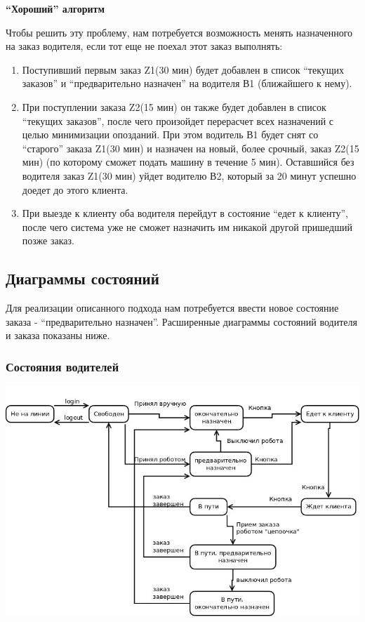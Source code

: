 		\textbf{“Хороший” алгоритм}

		Чтобы решить эту проблему, нам потребуется возможность менять назначенного на заказ водителя, если тот еще не поехал этот заказ выполнять:
		\begin{enumerate}

			\item{Поступивший первым заказ Z1(30 мин) будет добавлен в список “текущих заказов” и “предварительно назначен” на водителя В1 (ближайшего к нему).}

			\item{При поступлении заказа Z2(15 мин) он также будет добавлен в список “текущих заказов”, после чего произойдет перерасчет всех назначений с целью минимизации опозданий. При этом водитель В1 будет снят со “старого” заказа Z1(30 мин) и назначен на новый, более срочный, заказ Z2(15 мин) (по которому сможет подать машину в течение 5 мин). Оставшийся без водителя заказ Z1(30 мин) уйдет водителю В2, который за 20 минут успешно доедет до этого клиента.}

			\item{При выезде к клиенту оба водителя перейдут в состояние “едет к клиенту”, после чего система уже не сможет назначить им никакой другой пришедший позже заказ.}

		\end{enumerate}

	\subsection{Диаграммы состояний}

		Для реализации описанного подхода нам потребуется ввести новое состояние заказа - “предварительно назначен”. Расширенные диаграммы состояний водителя и заказа показаны ниже.

		\subsubsection{Состояния водителей}

			\includegraphics[width=\textwidth]{images/appendices/drivers_state}

